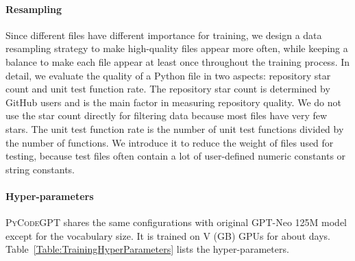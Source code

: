 \documentclass{article}
\newcommand{\codepy}{\textsc{PyCodeGPT}\xspace}
\begin{document}
\paragraph{Resampling}
Since different files have different importance for training, 
we design a data resampling strategy to make high-quality files appear more often, while keeping a balance to make each file appear at least once throughout the training process. 
In detail, we evaluate the quality of a Python file in two aspects: repository star count and unit test function rate. The repository star count is determined by GitHub users and is the main factor in measuring repository quality. We do not use the star count directly for filtering data because most files have very few stars.
The unit test function rate is the number of unit test functions divided by the number of functions. We introduce it to reduce the weight of files used for testing, because test files often contain a lot of user-defined numeric constants or string constants.

\paragraph{Hyper-parameters}
\codepy shares the same configurations with original GPT-Neo 125M model except for the vocabulary size. It is trained on  V (GB) GPUs for about  days. Table~\ref{Table:TrainingHyperParameters} lists the hyper-parameters.
\end{document}
